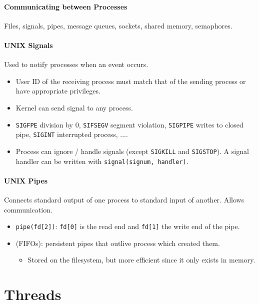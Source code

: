 \documentclass[twocolumn,english]{article}
\let\emph\relax
\begin{document}
\paragraph{Communicating between Processes}

Files, signals, pipes, message queues, sockets, shared memory, semaphores.


\paragraph{UNIX Signals}

Used to notify processes when an event occurs. 
\begin{itemize}
\item User ID of the receiving process must match that of the sending process
or have appropriate privileges. 
\item Kernel can send signal to any process. 
\item \texttt{SIGFPE} division by 0, \texttt{SIFSEGV} segment violation,
\texttt{SIGPIPE} writes to closed pipe, \texttt{SIGINT} interrupted
process, .... 
\item Process can ignore / handle signals (except \texttt{SIGKILL} and \texttt{SIGSTOP}).
A signal handler can be written with \texttt{signal(signum, handler)}.
\end{itemize}

\paragraph{UNIX Pipes}

Connects standard output of one process to standard input of another.
Allows \emph{one-way} communication. 
\begin{itemize}
\item \texttt{pipe(fd{[}2{]})}: \texttt{fd{[}0{]}} is the read end and \texttt{fd{[}1{]}}
the write end of the pipe. 
\item \emph{Named pipes} (FIFOs): persistent pipes that outlive process
which created them. 

\begin{itemize}
\item Stored on the filesystem, but more efficient since it only exists
in memory. 
\end{itemize}
\end{itemize}

\section{Threads}
\end{document}
